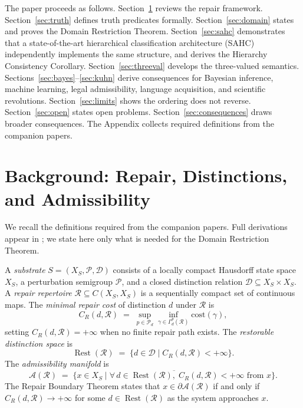 \documentclass[12pt, oneside]{article}
\theoremstyle{plain}
\theoremstyle{definition}
\theoremstyle{remark}
\DeclareMathOperator{\Rest}{Rest}
\newcommand{\CR}{C_{\!R}}
\newcommand{\AO}{\mathcal{A}}
\newcommand{\Dsub}{\mathcal{D}}
\newcommand{\Xsub}{X_S}
\newcommand{\RestR}{\Rest(\mathcal{R})}
\newcommand{\bA}{\partial\mathcal{A}}
\begin{document}
The paper proceeds as follows.
Section~\ref{sec:background} reviews the repair framework.
Section~\ref{sec:truth} defines truth predicates formally.
Section~\ref{sec:domain} states and proves the Domain Restriction
Theorem.
Section~\ref{sec:sahc} demonstrates that a state-of-the-art
hierarchical classification architecture (SAHC) independently
implements the same structure, and derives the Hierarchy
Consistency Corollary.
Section~\ref{sec:threeval} develops the three-valued semantics.
Sections~\ref{sec:bayes}--\ref{sec:kuhn} derive consequences for
Bayesian inference, machine learning, legal admissibility,
language acquisition, and scientific revolutions.
Section~\ref{sec:limits} shows the ordering does not reverse.
Section~\ref{sec:open} states open problems.
Section~\ref{sec:consequences} draws broader consequences.
The Appendix collects required definitions from the companion
papers.


\section{Background: Repair, Distinctions, and Admissibility}
\label{sec:background}

We recall the definitions required from the companion papers.
Full derivations appear in \cite{Flyxion2026a}; we state here only
what is needed for the Domain Restriction Theorem.

A \emph{substrate} $S = (\Xsub, \mathcal{P}, \Dsub)$ consists of
a locally compact Hausdorff state space $\Xsub$, a perturbation
semigroup $\mathcal{P}$, and a closed distinction relation
$\Dsub \subseteq \Xsub \times \Xsub$.
A \emph{repair repertoire} $\mathcal{R} \subseteq C(\Xsub, \Xsub)$
is a sequentially compact set of continuous maps.
The \emph{minimal repair cost} of distinction $d$ under $\mathcal{R}$
is
\[
  \CR(d, \mathcal{R})
  \;=\;
  \sup_{p \in \mathcal{P}_d}
  \inf_{\gamma \in \Gamma_d^p(\mathcal{R})}
  \mathrm{cost}(\gamma),
\]
setting $\CR(d, \mathcal{R}) = +\infty$ when no finite repair path
exists.
The \emph{restorable distinction space} is
\[
  \RestR
  \;=\;
  \bigl\{ d \in \Dsub \;\big|\; \CR(d, \mathcal{R}) < +\infty \bigr\}.
\]
The \emph{admissibility manifold} is
\[
  \AO(\mathcal{R})
  \;=\;
  \overline{\bigl\{
    x \in \Xsub \;\big|\;
    \forall\, d \in \RestR,\;
    \CR(d, \mathcal{R}) < +\infty \text{ from } x
  \bigr\}}.
\]
The Repair Boundary Theorem \cite{Flyxion2026a} states that
$x \in \bA(\mathcal{R})$ if and only if $\CR(d, \mathcal{R}) \to
+\infty$ for some $d \in \RestR$ as the system approaches $x$.
\end{document}
